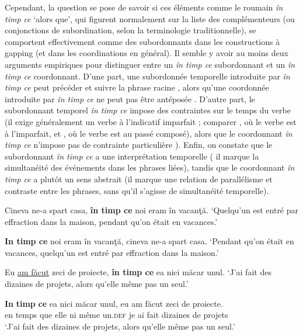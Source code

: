 Cependant, la question se pose de savoir si ces éléments comme le roumain \textit{în timp ce} ‘alors que’, qui figurent normalement sur la liste des complémenteurs (ou conjonctions de subordination, selon la terminologie traditionnelle), se comportent effectivement comme des subordonnants dans les constructions à gapping (et dans les coordinations en général). Il semble y avoir au moins deux arguments empiriques pour distinguer entre un \textit{în timp ce} subordonnant et un \textit{în timp ce} coordonnant. D’une part, une subordonnée temporelle introduite par \textit{în timp ce} peut précéder et suivre la phrase racine , alors qu’une coordonnée introduite par \textit{în timp ce} ne peut pas être antéposée . D’autre part, le subordonnant temporel \textit{în timp ce} impose des contraintes sur le temps du verbe (il exige généralement un verbe à l’indicatif imparfait ; comparer , où le verbe est à l’imparfait, et , où le verbe est au passé composé), alors que le coordonnant \textit{în timp ce} n’impose pas de contrainte particulière ). Enfin, on constate que le subordonnant \textit{în timp ce} a une interprétation temporelle ({\cad} il marque la simultanéité des événements dans les phrases liées), tandis que le coordonnant \textit{în timp ce} a plutôt un sens abstrait (il marque une relation de parallélisme et contraste entre les phrases, sans qu’il s’agisse de simultanéité temporelle).

\ea \label{ch2:ex40}
\ea Cineva ne-a spart casa, \textbf{în timp ce} noi eram în vacanţă. \label{ch2:ex40a}
\glt  ‘Quelqu’un est entré par effraction dans la maison, pendant qu’on était en vacances.’ 

\ex  \textbf{In timp ce} noi eram în vacanţă, cineva ne-a spart casa.
\glt  ‘Pendant qu’on était en vacances, quelqu’un est entré par effraction dans la maison.’
\z
\z


\ea \label{ch2:ex41}
\ea Eu \uline{am făcut} zeci de proiecte, \textbf{în timp ce} ea nici măcar unul.
\glt  ‘J’ai fait des dizaines de projets, alors qu’elle même pas un seul.’   

\ex  
\gll *\textbf{In} \textbf{timp} \textbf{ce}  ea  nici  măcar  unul,  eu  am  făcut  zeci  de  proiecte.\\
en  temps  que  elle  ni  même  un.\textsc{def}  je  ai  fait  dizaines  de  projets\\
\glt  ‘J’ai fait des dizaines de projets, alors qu’elle même pas un seul.’
\z
\z


